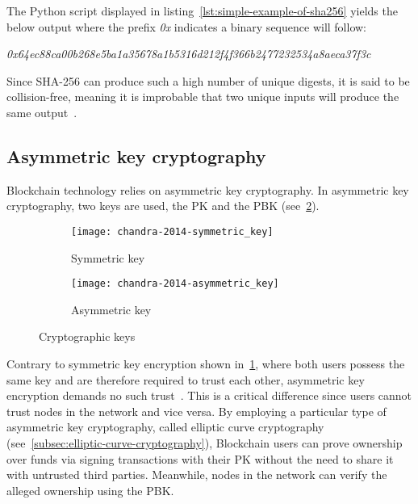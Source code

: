 The Python script displayed in listing~\ref{lst:simple-example-of-sha256} yields the below output where the prefix \emph{0x} indicates a binary sequence will follow:

\smallskip
\begingroup\small\emph{0x64ec88ca00b268e5ba1a35678a1b5316d212f4f366b2477232534a8aeca37f3c}\endgroup
\smallskip

Since SHA-256 can produce such a high number of unique digests, it is said to be collision-free, meaning it is improbable that two unique inputs will produce the same output~\autocite[8]{yaga_blockchain_2018}.

\subsection{Asymmetric key cryptography}\label{subsec:asymmetric-key-cryptography}

\Gls{Blockchain} technology relies on asymmetric key cryptography.
In asymmetric key cryptography, two keys are used, the \gls{PK} and the \gls{PBK} (see~\cref{fig:asymmetric-key}).

\begin{figure}[H]
    \begin{subfigure}[b]{\textwidth}
        \centering
        \texttt{[image: chandra-2014-symmetric\_key]}
        \caption{Symmetric key}
        \label{fig:symmetric-key}
    \end{subfigure}
    \begin{subfigure}[b]{\textwidth}
        \centering
        \texttt{[image: chandra-2014-asymmetric\_key]}
        \caption{Asymmetric key}
        \label{fig:asymmetric-key}
    \end{subfigure}
    \caption[Cryptographic keys]{Cryptographic keys~\autocite[84]{chandra_comparative_2014}}\label{fig:cryptographic-keys}
\end{figure}

Contrary to symmetric key encryption shown in~\cref{fig:symmetric-key}, where both users possess the same key and are therefore required to trust each other, asymmetric key encryption demands no such trust~\autocites[84]{chandra_comparative_2014}[11]{yaga_blockchain_2018}.
This is a critical difference since users cannot trust nodes in the network and vice versa.
By employing a particular type of asymmetric key cryptography, called elliptic curve cryptography (see~\cref{subsec:elliptic-curve-cryptography}), \gls{Blockchain} users can prove ownership over funds via signing transactions with their \gls{PK} without the need to share it with untrusted third parties.
Meanwhile, nodes in the network can verify the alleged ownership using the \gls{PBK}.

